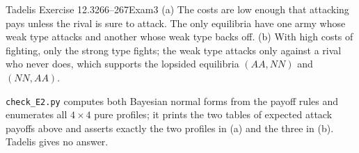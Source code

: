 \begin{exsol}{Tadelis Exercise 12.3}{266--267}{Exam}{3}
\interp (a) The costs are low enough that attacking pays unless the rival is sure to attack. The
only equilibria have one army whose weak type attacks and another whose weak type backs off.
(b) With high costs of fighting, only the strong type fights; the weak type attacks only against
a rival who never does, which supports the lopsided equilibria $(AA,NN)$ and $(NN,AA)$.

\verify \texttt{check\_E2.py} computes both Bayesian normal forms from the payoff rules and
enumerates all $4\times4$ pure profiles; it prints the two tables of expected attack payoffs above
and asserts exactly the two profiles in (a) and the three in (b). Tadelis gives no answer.

\end{exsol}
